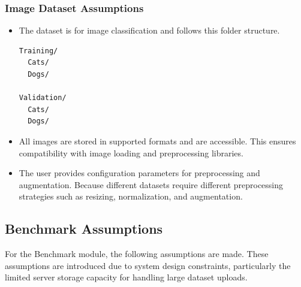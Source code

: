 \documentclass[12pt,a4paper]{report}
\begin{document}
\subsubsection{Image Dataset Assumptions}
\begin{itemize}

\item The dataset is for image classification and follows this folder structure.  
\begin{verbatim}
Training/
  Cats/
  Dogs/

Validation/
  Cats/
  Dogs/
\end{verbatim}
\item All images are stored in supported formats and are accessible.  
This ensures compatibility with image loading and preprocessing libraries.

\item The user provides configuration parameters for preprocessing and augmentation.  
Because different datasets require different preprocessing strategies such as resizing, normalization, and augmentation.

\end{itemize}

\subsection{Benchmark Assumptions}

For the Benchmark module, the following assumptions are made. These assumptions are introduced due to system design constraints, particularly the limited server storage capacity for handling large dataset uploads.
\end{document}

